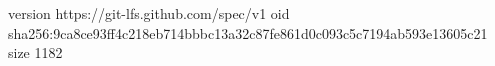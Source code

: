 version https://git-lfs.github.com/spec/v1
oid sha256:9ca8ce93ff4c218eb714bbbc13a32c87fe861d0c093c5c7194ab593e13605c21
size 1182
